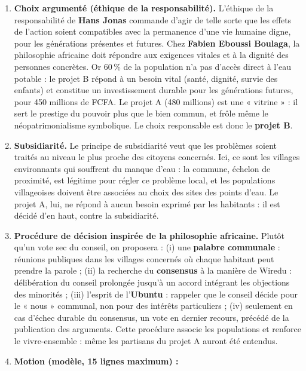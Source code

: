 \documentclass[11pt]{article}
\begin{document}
\begin{corrige}
\begin{enumerate}
\item \textbf{Choix argumenté (éthique de la responsabilité).} L'éthique de la responsabilité de \textbf{Hans Jonas} commande d'agir de telle sorte que les effets de l'action soient compatibles avec la permanence d'une vie humaine digne, pour les générations présentes et futures. Chez \textbf{Fabien Eboussi Boulaga}, la philosophie africaine doit répondre aux exigences vitales et à la dignité des personnes concrètes. Or $60\,\%$ de la population n'a pas d'accès direct à l'eau potable : le projet B répond à un besoin vital (santé, dignité, survie des enfants) et constitue un investissement durable pour les générations futures, pour 450 millions de FCFA. Le projet A (480 millions) est une « vitrine » : il sert le prestige du pouvoir plus que le bien commun, et frôle même le néopatrimonialisme symbolique. Le choix responsable est donc le \textbf{projet B}.
\item \textbf{Subsidiarité.} Le principe de subsidiarité veut que les problèmes soient traités au niveau le plus proche des citoyens concernés. Ici, ce sont les villages environnants qui souffrent du manque d'eau : la commune, échelon de proximité, est légitime pour régler ce problème local, et les populations villageoises doivent être associées au choix des sites des points d'eau. Le projet A, lui, ne répond à aucun besoin exprimé par les habitants : il est décidé d'en haut, contre la subsidiarité.
\item \textbf{Procédure de décision inspirée de la philosophie africaine.} Plutôt qu'un vote sec du conseil, on proposera : (i) une \textbf{palabre communale} : réunions publiques dans les villages concernés où chaque habitant peut prendre la parole ; (ii) la recherche du \textbf{consensus} à la manière de Wiredu : délibération du conseil prolongée jusqu'à un accord intégrant les objections des minorités ; (iii) l'esprit de l'\textbf{Ubuntu} : rappeler que le conseil décide pour le « nous » communal, non pour des intérêts particuliers ; (iv) seulement en cas d'échec durable du consensus, un vote en dernier recours, précédé de la publication des arguments. Cette procédure associe les populations et renforce le vivre-ensemble : même les partisans du projet A auront été entendus.
\item \textbf{Motion (modèle, 15 lignes maximum) :}


\end{enumerate}
\end{corrige}
\end{document}
